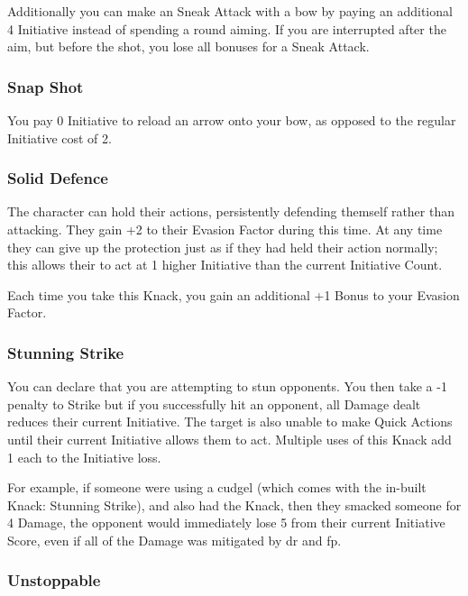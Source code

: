 \begin{multicols}{2}
Additionally you can make an Sneak Attack with a bow by paying an additional 4 Initiative instead of spending a \gls{round} aiming.
If you are interrupted after the aim, but before the shot, you lose all bonuses for a Sneak Attack.

\subsubsection{Snap Shot}

You pay 0 Initiative to reload an arrow onto your bow, as opposed to the regular Initiative cost of 2.

\subsubsection{Solid Defence}\label{soliddefence}

The character can hold their actions, persistently defending themself rather than attacking. They gain +2 to their Evasion Factor during this time. At any time they can give up the protection just as if they had held their action normally; this allows their to act at 1 higher Initiative than the current Initiative Count.

Each time you take this Knack, you gain an additional +1 Bonus to your Evasion Factor.

\subsubsection{Stunning Strike}\label{stunningstrike}

You can declare that you are attempting to stun opponents.
You then take a -1 penalty to Strike but if you successfully hit an opponent, all Damage dealt reduces their current Initiative.
The target is also unable to make Quick Actions until their current Initiative allows them to act.
Multiple uses of this Knack add 1 each to the Initiative loss.

For example, if someone were using a cudgel (which comes with the in-built Knack: Stunning Strike), and also had the Knack, then they smacked someone for 4 Damage, the opponent would immediately lose 5 from their current Initiative Score, even if all of the Damage was mitigated by \gls{dr} and \gls{fp}.

\subsubsection{Unstoppable}


\end{multicols}
